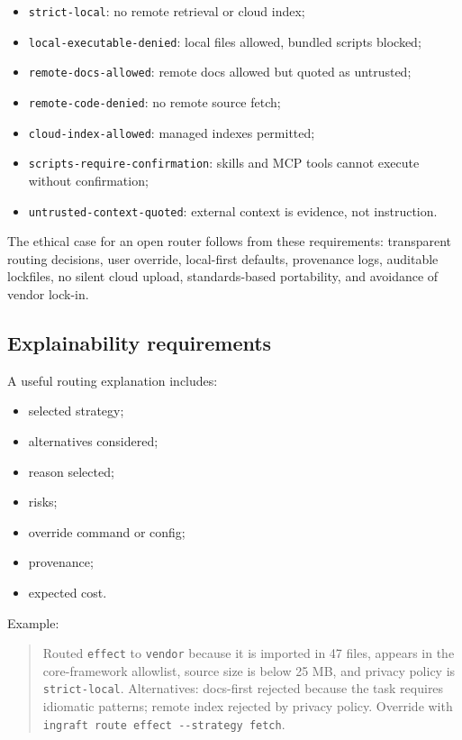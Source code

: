 \documentclass[
  11pt,
  letterpaper,
  numbers=noendperiod,
  parskip=half]{scrartcl}
\providecommand{\tightlist}{%
  \setlength{\itemsep}{0pt}\setlength{\parskip}{0pt}}
\begin{document}
\begin{itemize}
\tightlist
\item
  \texttt{strict-local}: no remote retrieval or cloud index;
\item
  \texttt{local-executable-denied}: local files allowed, bundled scripts
  blocked;
\item
  \texttt{remote-docs-allowed}: remote docs allowed but quoted as
  untrusted;
\item
  \texttt{remote-code-denied}: no remote source fetch;
\item
  \texttt{cloud-index-allowed}: managed indexes permitted;
\item
  \texttt{scripts-require-confirmation}: skills and MCP tools cannot
  execute without confirmation;
\item
  \texttt{untrusted-context-quoted}: external context is evidence, not
  instruction.
\end{itemize}

The ethical case for an open router follows from these requirements:
transparent routing decisions, user override, local-first defaults,
provenance logs, auditable lockfiles, no silent cloud upload,
standards-based portability, and avoidance of vendor lock-in.

\subsection{Explainability requirements}\label{sec-explainability}

A useful routing explanation includes:

\begin{itemize}
\tightlist
\item
  selected strategy;
\item
  alternatives considered;
\item
  reason selected;
\item
  risks;
\item
  override command or config;
\item
  provenance;
\item
  expected cost.
\end{itemize}

Example:

\begin{quote}
Routed \texttt{effect} to \texttt{vendor} because it is imported in 47
files, appears in the core-framework allowlist, source size is below 25
MB, and privacy policy is \texttt{strict-local}. Alternatives:
docs-first rejected because the task requires idiomatic patterns; remote
index rejected by privacy policy. Override with
\texttt{ingraft\ route\ effect\ -\/-strategy\ fetch}.
\end{quote}
\end{document}
